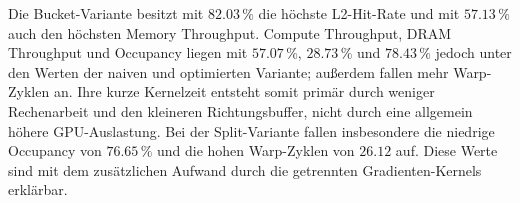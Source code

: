 Die Bucket-Variante besitzt mit $82.03\,\%$ die höchste L2-Hit-Rate und mit
$57.13\,\%$ auch den höchsten Memory Throughput. Compute Throughput, DRAM
Throughput und Occupancy liegen mit $57.07\,\%$, $28.73\,\%$ und $78.43\,\%$
jedoch unter den Werten der naiven und optimierten Variante; außerdem fallen
mehr Warp-Zyklen an. Ihre kurze Kernelzeit entsteht somit primär durch weniger
Rechenarbeit und den kleineren Richtungsbuffer, nicht durch eine allgemein
höhere GPU-Auslastung. Bei der Split-Variante fallen insbesondere die
niedrige Occupancy von $76.65\,\%$ und die hohen Warp-Zyklen von $26.12$ auf.
Diese Werte sind mit dem zusätzlichen Aufwand durch die getrennten
Gradienten-Kernels erklärbar.
